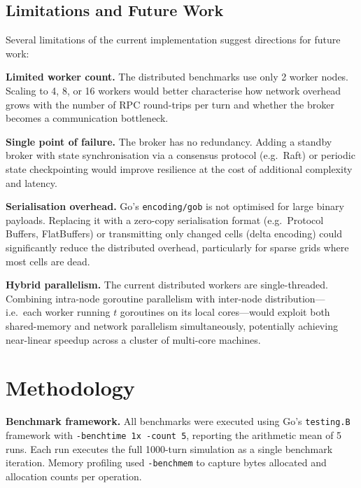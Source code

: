 \documentclass[10pt,twocolumn]{article}
\begin{document}
\subsection{Limitations and Future Work}\label{sec:future}

Several limitations of the current implementation suggest directions for future work:

\textbf{Limited worker count.}
The distributed benchmarks use only 2 worker nodes.
Scaling to 4, 8, or 16 workers would better characterise how network overhead grows with the number of RPC round-trips per turn and whether the broker becomes a communication bottleneck.

\textbf{Single point of failure.}
The broker has no redundancy.
Adding a standby broker with state synchronisation via a consensus protocol (e.g.\ Raft) or periodic state checkpointing would improve resilience at the cost of additional complexity and latency.

\textbf{Serialisation overhead.}
Go's \texttt{encoding/gob} is not optimised for large binary payloads.
Replacing it with a zero-copy serialisation format (e.g.\ Protocol Buffers, FlatBuffers) or transmitting only changed cells (delta encoding) could significantly reduce the distributed overhead, particularly for sparse grids where most cells are dead.

\textbf{Hybrid parallelism.}
The current distributed workers are single-threaded.
Combining intra-node goroutine parallelism with inter-node distribution---i.e.\ each worker running $t$ goroutines on its local cores---would exploit both shared-memory and network parallelism simultaneously, potentially achieving near-linear speedup across a cluster of multi-core machines.

\section{Methodology}\label{sec:methodology}

\textbf{Benchmark framework.}
All benchmarks were executed using Go's \texttt{testing.B} framework with \texttt{-benchtime 1x -count 5}, reporting the arithmetic mean of 5 runs.
Each run executes the full 1000-turn simulation as a single benchmark iteration.
Memory profiling used \texttt{-benchmem} to capture bytes allocated and allocation counts per operation.
\end{document}
